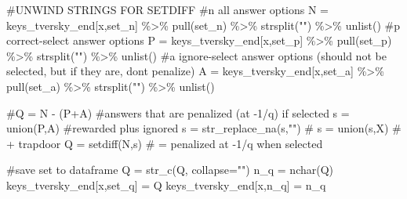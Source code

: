 \documentclass[
  letterpaper,
  DIV=11,
  numbers=noendperiod]{scrreprt}
\newenvironment{Shaded}{\begin{snugshade}}{\end{snugshade}}
\newcommand{\AttributeTok}[1]{\textcolor[rgb]{0.40,0.45,0.13}{#1}}
\newcommand{\CommentTok}[1]{\textcolor[rgb]{0.37,0.37,0.37}{#1}}
\newcommand{\FunctionTok}[1]{\textcolor[rgb]{0.28,0.35,0.67}{#1}}
\newcommand{\NormalTok}[1]{\textcolor[rgb]{0.00,0.23,0.31}{#1}}
\newcommand{\OtherTok}[1]{\textcolor[rgb]{0.00,0.23,0.31}{#1}}
\newcommand{\SpecialCharTok}[1]{\textcolor[rgb]{0.37,0.37,0.37}{#1}}
\newcommand{\StringTok}[1]{\textcolor[rgb]{0.13,0.47,0.30}{#1}}
\begin{document}
\begin{Shaded}
\begin{Highlighting}[]
  \CommentTok{\#UNWIND STRINGS FOR SETDIFF}
  \CommentTok{\#n all answer options}
\NormalTok{  N }\OtherTok{=}\NormalTok{ keys\_tversky\_end[x,}\StringTok{\textquotesingle{}set\_n\textquotesingle{}}\NormalTok{] }\SpecialCharTok{\%\textgreater{}\%} \FunctionTok{pull}\NormalTok{(set\_n) }\SpecialCharTok{\%\textgreater{}\%} \FunctionTok{strsplit}\NormalTok{(}\StringTok{""}\NormalTok{) }\SpecialCharTok{\%\textgreater{}\%} \FunctionTok{unlist}\NormalTok{()}
  \CommentTok{\#p correct{-}select answer options}
\NormalTok{  P }\OtherTok{=}\NormalTok{ keys\_tversky\_end[x,}\StringTok{\textquotesingle{}set\_p\textquotesingle{}}\NormalTok{] }\SpecialCharTok{\%\textgreater{}\%} \FunctionTok{pull}\NormalTok{(set\_p) }\SpecialCharTok{\%\textgreater{}\%} \FunctionTok{strsplit}\NormalTok{(}\StringTok{""}\NormalTok{) }\SpecialCharTok{\%\textgreater{}\%} \FunctionTok{unlist}\NormalTok{()}
  \CommentTok{\#a ignore{-}select answer options (should not be selected, but if they are, don\textquotesingle{}t penalize)}
\NormalTok{  A }\OtherTok{=}\NormalTok{ keys\_tversky\_end[x,}\StringTok{\textquotesingle{}set\_a\textquotesingle{}}\NormalTok{] }\SpecialCharTok{\%\textgreater{}\%} \FunctionTok{pull}\NormalTok{(set\_a) }\SpecialCharTok{\%\textgreater{}\%} \FunctionTok{strsplit}\NormalTok{(}\StringTok{""}\NormalTok{) }\SpecialCharTok{\%\textgreater{}\%} \FunctionTok{unlist}\NormalTok{()}
  
  \CommentTok{\#Q = N {-} (P+A)}
  \CommentTok{\#answers that are penalized (at {-}1/q) if selected }
\NormalTok{  s }\OtherTok{=} \FunctionTok{union}\NormalTok{(P,A) }\CommentTok{\#rewarded plus ignored }
\NormalTok{  s }\OtherTok{=} \FunctionTok{str\_replace\_na}\NormalTok{(s,}\StringTok{""}\NormalTok{)}
  \CommentTok{\# s = union(s,X) \# + trapdoor }
\NormalTok{  Q }\OtherTok{=} \FunctionTok{setdiff}\NormalTok{(N,s) }\CommentTok{\# = penalized at {-}1/q when selected }
  
  \CommentTok{\#save set to dataframe}
\NormalTok{  Q }\OtherTok{=} \FunctionTok{str\_c}\NormalTok{(Q, }\AttributeTok{collapse=}\StringTok{""}\NormalTok{)}
\NormalTok{  n\_q }\OtherTok{=} \FunctionTok{nchar}\NormalTok{(Q)}
\NormalTok{  keys\_tversky\_end[x,}\StringTok{\textquotesingle{}set\_q\textquotesingle{}}\NormalTok{] }\OtherTok{=}\NormalTok{ Q}
\NormalTok{  keys\_tversky\_end[x,}\StringTok{\textquotesingle{}n\_q\textquotesingle{}}\NormalTok{] }\OtherTok{=}\NormalTok{ n\_q}
  

\end{Highlighting}
\end{Shaded}
\end{document}
